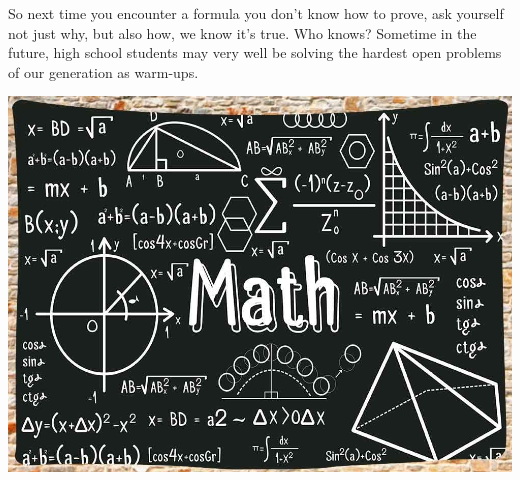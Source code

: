 \documentclass{article}
\begin{document}
So next time you encounter a formula you don’t know how to prove, ask yourself not just why, but also how, we know it’s true. Who knows? Sometime in the future, high school students may very well be solving the hardest open problems of our generation as warm-ups. 
\begin{center}
\includegraphics[scale=0.45]{images/math_p.png}
\end{center}
\end{document}
